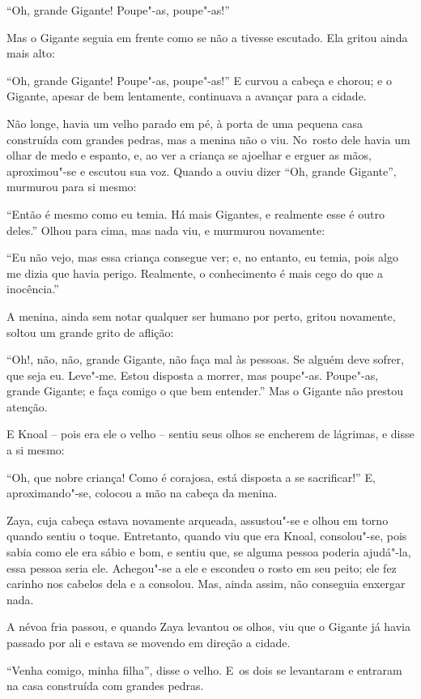 ``Oh, grande Gigante! Poupe"-as, poupe"-as!''

Mas o Gigante seguia em frente como se não a tivesse escutado. Ela
gritou ainda mais alto:

``Oh, grande Gigante! Poupe"-as, poupe"-as!'' E curvou a cabeça e chorou;
e o Gigante, apesar de bem lentamente, continuava a avançar para a
cidade.

Não longe, havia um velho parado em pé, à porta de uma pequena casa
construída com grandes pedras, mas a menina não o viu. No~rosto dele
havia um olhar de medo e espanto, e, ao ver a criança se ajoelhar e
erguer as mãos, aproximou"-se e escutou sua voz. Quando a ouviu dizer
``Oh, grande Gigante'', murmurou para si mesmo:

``Então é mesmo como eu temia. Há mais Gigantes, e realmente esse é
outro deles.'' Olhou para cima, mas nada viu, e murmurou novamente:

``Eu não vejo, mas essa criança consegue ver; e, no entanto, eu temia,
pois algo me dizia que havia perigo. Realmente, o conhecimento é mais
cego do que a inocência.''

A menina, ainda sem notar qualquer ser humano por perto, gritou
novamente, soltou um grande grito de aflição:

``Oh!, não, não, grande Gigante, não faça mal às pessoas. Se alguém deve
sofrer, que seja eu. Leve"-me. Estou disposta a morrer, mas poupe"-as.
Poupe"-as, grande Gigante; e faça comigo o que bem entender.'' Mas o
Gigante não prestou atenção.

E Knoal -- pois era ele o velho -- sentiu seus olhos se encherem de
lágrimas, e disse a si mesmo:

``Oh, que nobre criança! Como é corajosa, está disposta a se
sacrificar!'' E, aproximando"-se, colocou a mão na cabeça da menina.

Zaya, cuja cabeça estava novamente arqueada, assustou"-se e olhou em
torno quando sentiu o toque. Entretanto, quando viu que era Knoal,
consolou"-se, pois sabia como ele era sábio e bom, e sentiu que, se
alguma pessoa poderia ajudá"-la, essa pessoa seria ele. Achegou"-se a ele e escondeu o
rosto em seu peito; ele fez carinho nos cabelos dela e a consolou. Mas,
ainda assim, não conseguia enxergar nada.

A névoa fria passou, e quando Zaya levantou os olhos, viu que o Gigante
já havia passado por ali e estava se movendo em direção a cidade.

``Venha comigo, minha filha'', disse o velho. E~os dois se levantaram e
entraram na casa construída com grandes pedras.

